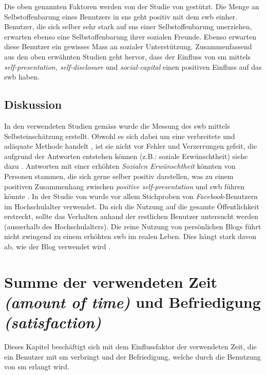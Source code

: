 Die oben genannten Faktoren werden von der Studie von  gestützt. Die Menge an Selbstoffenbarung eines Benutzers in \gls{sns} geht positiv mit dem \gls{swb} einher. Benutzer, die sich selber sehr stark auf \gls{sns} einer Selbstoffenbarung unerziehen, erwarten ebenso eine Selbstoffenbarung ihrer sozialen Freunde. Ebenso erwarten diese Benutzer ein gewisses Mass an sozialer Unterstützung.\newline
Zusammenfassend aus den oben erwähnten Studien geht hervor, dass der Einfluss von \gls{sm} mittels \textit{self-presentation, self-disclosure} und \textit{social-capital} einen positiven Einfluss auf das \gls{swb} haben.

\subsection{Diskussion}\label{subsec.selfpDiskussion}
In den verwendeten Studien gemäss  wurde die Messung des \gls{swb} mittels Selbsteinschätzung erstellt. Obwohl es sich dabei um eine verbreitete und adäquate Methode handelt \cite{Diener:2005}, ist sie nicht vor Fehler und Verzerrungen gefeit, die aufgrund der Antworten entstehen können (z.B.: soziale Erwünschtheit) siehe dazu . Antworten mit einer erhöhten \textit{Sozialen Erwünschtheit} könnten von Personen stammen, die sich gerne selber positiv darstellen, was zu einem positiven Zusammenhang zwischen \textit{positive self-presentation} und \gls{swb} führen könnte \cite{Diener:1991}.\newline
In der Studie von  wurde vor allem Stichproben von \textit{Facebook}-Benutzern im Hochschulalter verwendet. Da sich die Nutzung auf die gesamte Öffentlichkeit erstreckt, sollte das Verhalten anhand der restlichen Benutzer untersucht werden (ausserhalb des Hochschulalters).\newline
Die reine Nutzung von persönlichen Blogs führt nicht zwingend zu einem erhöhten \gls{swb} im realen Leben. Dies hängt stark davon ab, wie der Blog verwendet wird \cite{Jung:2012}.

\section{Summe der verwendeten Zeit \textit{(amount of time)} und Befriedigung \textit{(satisfaction)}}\label{sub.amount}
Dieses Kapitel beschäftigt sich mit dem Einflussfaktor der verwendeten Zeit, die ein Benutzer mit \gls{sm} verbringt und der Befriedigung, welche durch die Benutzung von \gls{sm} erlangt wird. 

